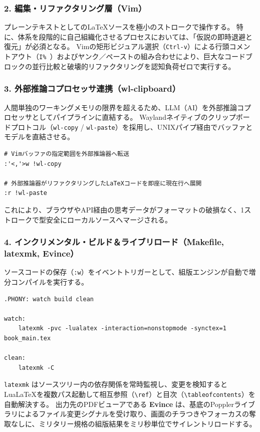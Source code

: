 \subsubsection{2. 編集・リファクタリング層（Vim）}
プレーンテキストとしてのLaTeXソースを極小のストロークで操作する。
特に、体系を段階的に自己組織化させるプロセスにおいては、「仮説の即時退避と復元」が必須となる。
Vimの矩形ビジュアル選択（\texttt{Ctrl-v}）による行頭コメントアウト（\texttt{I\% }）およびヤンク／ペーストの組み合わせにより、巨大なコードブロックの並行比較と破壊的リファクタリングを認知負荷ゼロで実行する。

\subsubsection{3. 外部推論コプロセッサ連携（wl-clipboard）}
人間単独のワーキングメモリの限界を超えるため、LLM（AI）を外部推論コプロセッサとしてパイプラインに直結する。
Waylandネイティブのクリップボードプロトコル（\texttt{wl-copy} / \texttt{wl-paste}）を採用し、UNIXパイプ経由でバッファとモデルを直結させる。

\begin{verbatim}
# Vimバッファの指定範囲を外部推論器へ転送
:'<,'>w !wl-copy

# 外部推論器がリファクタリングしたLaTeXコードを即座に現在行へ展開
:r !wl-paste
\end{verbatim}

これにより、ブラウザやAPI経由の思考データがフォーマットの破損なく、1ストロークで型安全にローカルソースへマージされる。

\subsubsection{4. インクリメンタル・ビルド＆ライブリロード（Makefile, latexmk, Evince）}
ソースコードの保存（\texttt{:w}）をイベントトリガーとして、組版エンジンが自動で増分コンパイルを実行する。

\begin{verbatim}
.PHONY: watch build clean

watch:
	latexmk -pvc -lualatex -interaction=nonstopmode -synctex=1 book_main.tex

clean:
	latexmk -C
\end{verbatim}

\texttt{latexmk} はソースツリー内の依存関係を常時監視し、変更を検知するとLuaLaTeXを複数パス起動して相互参照（\texttt{\textbackslash ref}）と目次（\texttt{\textbackslash tableofcontents}）を自動解決する。
出力先のPDFビューアである \textbf{Evince} は、基底のPopplerライブラリによるファイル変更シグナルを受け取り、画面のチラつきやフォーカスの奪取なしに、ミリタリー規格の組版結果をミリ秒単位でサイレントリロードする。

